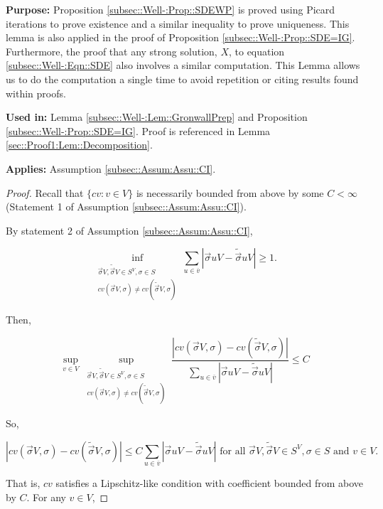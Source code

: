 \documentclass[12pt]{article}
\newcommand{\ov}{\overline}
\newcommand{\te}{\text}
\newcommand{\purpose}{\textbf{Purpose: }}
\newcommand{\usein}{\textbf{Used in: }}
\newcommand{\app}{\textbf{Applies: }}
\newcommand{\ind}{\hspace{24pt}}
\renewcommand{\v}{v}							%
\newcommand{\vv}{u}								%
\renewcommand{\S}{S}							%
\newcommand{\s}{\sigma}							%
\newcommand{\sv}{\vec{\s}}						%
\newcommand{\X}{X}								%
\newcommand{\IGr}{c}							%
\newcommand{\cl}{\ov}							%
\newcommand{\const}{C}							%
\newcommand{\alt}[1]{\widetilde{#1}}			%
\begin{document}
\purpose Proposition \ref{subsec::Well-:Prop::SDEWP} is proved using Picard iterations to prove existence and a similar inequality to prove uniqueness. This lemma is also applied in the proof of Proposition \ref{subsec::Well-:Prop::SDE=IG}. Furthermore, the proof that any strong solution, \(\X{}{}\), to equation \eqref{subsec::Well-:Eqn::SDE} also involves a similar computation. This Lemma allows us to do the computation a single time to avoid repetition or citing results found within proofs.

\usein Lemma \ref{subsec::Well-:Lem::GronwallPrep} and Proposition \ref{subsec::Well-:Prop::SDE=IG}. Proof is referenced in Lemma \ref{sec::Proof1:Lem::Decomposition}.

\app Assumption \ref{subsec::Assum:Assu::CI}.

\begin{proof}
Recall that \(\{\IGr{\v}:\v\in V\}\) is necessarily bounded from above by some \(\const{} < \infty\) (Statement 1 of Assumption \ref{subsec::Assum:Assu::CI}). 

\ind By statement 2 of Assumption \ref{subsec::Assum:Assu::CI}, 

\[\inf_{\substack{\sv{}{ V},\alt{\sv}{}{ V} \in \S^ V, \s\in \S\\ \IGr{\v}(\sv{}{ V},\s) \neq \IGr{\v}(\alt{\sv}{}{ V},\s)}} \sum_{\vv \in \cl{\v}} |\sv{\vv}{ V} - \alt{\sv}{\vv}{ V}| \geq 1.\]

Then,

\[\sup_{\v\in  V} \sup_{\substack{\sv{}{ V},\alt{\sv}{}{ V} \in \S^ V, \s\in \S\\ \IGr{\v}(\sv{}{ V},\s) \neq \IGr{\v}(\alt{\sv}{}{ V},\s)}} \frac{|\IGr{\v}(\sv{}{ V},\s) - \IGr{\v}(\alt{\sv}{}{ V},\s)|}{\sum_{\vv \in \cl{\v}} |\sv{\vv}{ V} - \alt{\sv}{\vv}{ V}|} \leq \const{}\]

So,

\[|\IGr{\v}(\sv{}{ V},\s) - \IGr{\v}(\alt{\sv}{}{V},\s)|\leq \const{}\sum_{\vv \in \cl{\v}} |\sv{\vv}{ V} - \alt{\sv}{\vv}{V}| \te{ for all } \sv{}{ V},\alt{\sv}{}{V}\in \S^ V,\s\in \S\te{ and }\v\in  V.\]

That is, \(\IGr{\v}\) satisfies a Lipschitz-like condition with coefficient bounded from above by \(\const{}\). For any \(\v\in  V\),


\end{proof}
\end{document}
